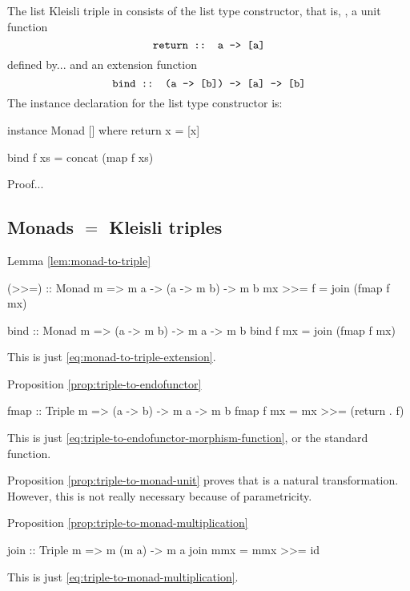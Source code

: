 \begin{example}
  \label{ex:triple-list-haskell}

  The list Kleisli triple in \hask consists of the list type
  constructor, that is, \texthaskell{[]}, a unit function
  \begin{equation*}
    \text{\texttt{return :: a -> [a]}}
  \end{equation*}
  defined by... and an extension function
  \begin{equation*}
    \text{\texttt{bind :: (a -> [b]) -> [a] -> [b]}}
  \end{equation*}
  The instance declaration for the list type constructor is:
  \begin{codehaskell}
instance Monad [] where
  return x = [x]

  bind f xs = concat (map f xs)
  \end{codehaskell}

  Proof...

\end{example}

\subsection*{Monads $=$ Kleisli triples}

Lemma \ref{lem:monad-to-triple}

\begin{codehaskell}
(>>=) :: Monad m => m a -> (a -> m b) -> m b
mx >>= f = join (fmap f mx)
\end{codehaskell}

\begin{codehaskell}
bind :: Monad m => (a -> m b) -> m a -> m b
bind f mx = join (fmap f mx)
\end{codehaskell}
This is just \eqref{eq:monad-to-triple-extension}.

Proposition \ref{prop:triple-to-endofunctor}
\begin{codehaskell}
fmap :: Triple m => (a -> b) -> m a -> m b
fmap f mx = mx >>= (return . f)
\end{codehaskell}
This is just \eqref{eq:triple-to-endofunctor-morphism-function}, or
the standard  function.

Proposition \ref{prop:triple-to-monad-unit} proves that
 is a natural transformation. However, this is not
really necessary because of parametricity.

Proposition \ref{prop:triple-to-monad-multiplication}
\begin{codehaskell}
join :: Triple m => m (m a) -> m a
join mmx = mmx >>= id
\end{codehaskell}
This is just \eqref{eq:triple-to-monad-multiplication}.

